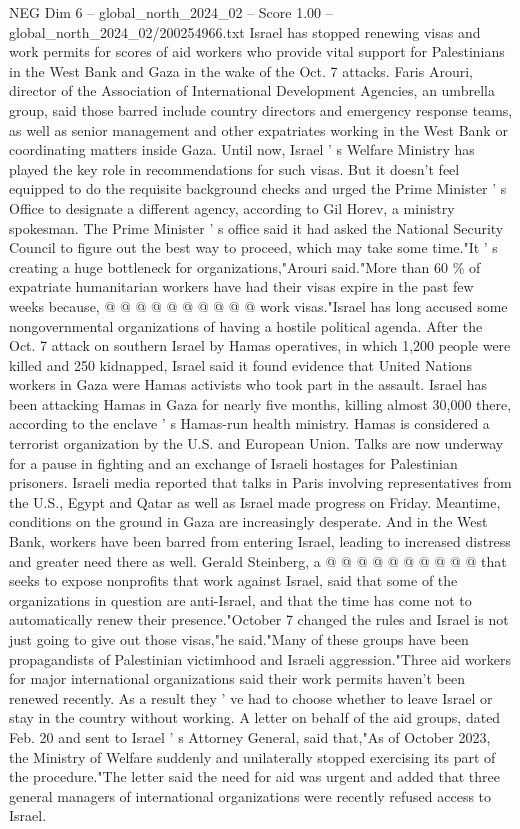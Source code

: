 \begin{textsample}{NEG Dim 6 – global\_north\_2024\_02 – Score 1.00 – global\_north\_2024\_02/200254966.txt}  \label{ex:f6_neg_255}
Israel has stopped renewing visas and work permits for scores of aid workers who provide vital support for Palestinians in the West Bank and Gaza in the wake of the Oct. 7 attacks.
Faris Arouri, director of the Association of International Development Agencies, an umbrella group, said those barred include country directors and emergency response teams, as well as senior management and other expatriates working in the West Bank or coordinating matters inside Gaza.
Until now, Israel ' s Welfare Ministry has played the key role in recommendations for such visas.
But it doesn't feel equipped to do the requisite background checks and urged the Prime Minister ' s Office to designate a different agency, according to Gil Horev, a ministry spokesman.
The Prime Minister ' s office said it had asked the National Security Council to figure out the best way to proceed, which may take some time."It ' s creating a huge bottleneck for organizations,"Arouri said."More than 60 \% of expatriate humanitarian workers have had their visas expire in the past few weeks because, @ @ @ @ @ @ @ @ @ @ work visas."Israel has long accused some nongovernmental organizations of having a hostile political agenda.
After the Oct. 7 attack on southern Israel by Hamas operatives, in which 1,200 people were killed and 250 kidnapped, Israel said it found evidence that United Nations workers in Gaza were Hamas activists who took part in the assault.
Israel has been attacking Hamas in Gaza for nearly five months, killing almost 30,000 there, according to the enclave ' s Hamas-run health ministry.
Hamas is considered a terrorist organization by the U.S. and European Union.
Talks are now underway for a pause in fighting and an exchange of Israeli hostages for Palestinian prisoners.
Israeli media reported that talks in Paris involving representatives from the U.S., Egypt and Qatar as well as Israel made progress on Friday.
Meantime, conditions on the ground in Gaza are increasingly desperate.
And in the West Bank, workers have been barred from entering Israel, leading to increased distress and greater need there as well.
Gerald Steinberg, a @ @ @ @ @ @ @ @ @ @ that seeks to expose nonprofits that work against Israel, said that some of the organizations in question are anti-Israel, and that the time has come not to automatically renew their presence."October 7 changed the rules and Israel is not just going to give out those visas,"he said."Many of these groups have been propagandists of Palestinian victimhood and Israeli aggression."Three aid workers for major international organizations said their work permits haven't been renewed recently.
As a result they ' ve had to choose whether to leave Israel or stay in the country without working.
A letter on behalf of the aid groups, dated Feb. 20 and sent to Israel ' s Attorney General, said that,"As of October 2023, the Ministry of Welfare suddenly and unilaterally stopped exercising its part of the procedure."The letter said the need for aid was urgent and added that three general managers of international organizations were recently refused access to Israel.

\end{textsample}
